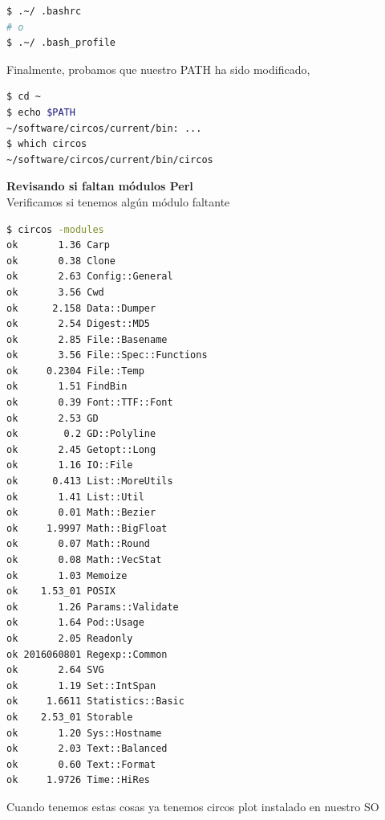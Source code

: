 \documentclass[12pt,letterpaper]{article}
\begin{document}
\begin{lstlisting}[language=bash, style=consola]
$ .~/ .bashrc
# o 
$ .~/ .bash_profile
\end{lstlisting}
Finalmente, probamos que nuestro PATH ha sido modificado,\\
\begin{lstlisting}[language=bash, style=consola]
$ cd ~
$ echo $PATH
~/software/circos/current/bin: ...
$ which circos
~/software/circos/current/bin/circos
\end{lstlisting}
\textbf{Revisando si faltan módulos Perl}\\
Verificamos si tenemos algún módulo faltante\\
\begin{lstlisting}[language=bash, style=consola]
$ circos -modules
ok       1.36 Carp
ok       0.38 Clone
ok       2.63 Config::General
ok       3.56 Cwd
ok      2.158 Data::Dumper
ok       2.54 Digest::MD5
ok       2.85 File::Basename
ok       3.56 File::Spec::Functions
ok     0.2304 File::Temp
ok       1.51 FindBin
ok       0.39 Font::TTF::Font
ok       2.53 GD
ok        0.2 GD::Polyline
ok       2.45 Getopt::Long
ok       1.16 IO::File
ok      0.413 List::MoreUtils
ok       1.41 List::Util
ok       0.01 Math::Bezier
ok     1.9997 Math::BigFloat
ok       0.07 Math::Round
ok       0.08 Math::VecStat
ok       1.03 Memoize
ok    1.53_01 POSIX
ok       1.26 Params::Validate
ok       1.64 Pod::Usage
ok       2.05 Readonly
ok 2016060801 Regexp::Common
ok       2.64 SVG
ok       1.19 Set::IntSpan
ok     1.6611 Statistics::Basic
ok    2.53_01 Storable
ok       1.20 Sys::Hostname
ok       2.03 Text::Balanced
ok       0.60 Text::Format
ok     1.9726 Time::HiRes
\end{lstlisting}
Cuando tenemos estas cosas ya tenemos circos plot instalado en nuestro SO
\end{document}
